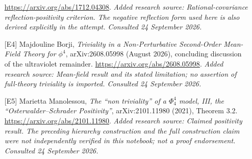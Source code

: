 \documentclass[11pt]{article}
\begin{document}
\begin{itemize}
\url{https://arxiv.org/abs/1712.04308}.
{\small\textit{Added research source: Rational-covariance reflection-positivity criterion. The negative reflection form used here is also derived explicitly in the attempt. Consulted 24 September 2026.}}
\item[\textnormal{[E4]}]\hypertarget{extra:statement:4}{} Majdouline Borji, \emph{Triviality in a Non-Perturbative Second-Order Mean-Field Theory for $\phi^4$}, arXiv:2608.05998 (August 2026), concluding discussion of the ultraviolet remainder.
\url{https://arxiv.org/abs/2608.05998}.
{\small\textit{Added research source: Mean-field result and its stated limitation; no assertion of full-theory triviality is imported. Consulted 24 September 2026.}}
\item[\textnormal{[E5]}]\hypertarget{extra:statement:5}{} Marietta Manolessou, \emph{The ``non triviality'' of a $\Phi^4_4$ model, III, the ``Osterwalder--Schrader Positivity''}, arXiv:2101.11980 (2021), Theorem 3.2.
\url{https://arxiv.org/abs/2101.11980}.
{\small\textit{Added research source: Claimed positivity result. The preceding hierarchy construction and the full construction claim were not independently verified in this notebook; not a proof endorsement. Consulted 24 September 2026.}}
\end{itemize}
\end{document}
